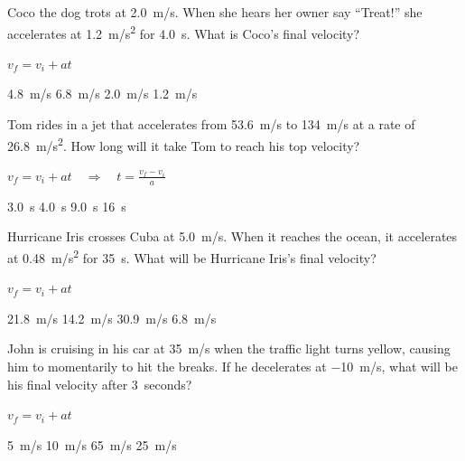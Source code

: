\documentclass[]{exam}
\theoremstyle{definition}
\begin{document}
\begin{questions}

\question
Coco the dog trots at \SI{2.0}{m/s}. When she hears her owner say ``Treat!'' she accelerates at \SI{1.2}{m/s^2} for \SI{4.0}{s}. What is Coco's final velocity?

\ifprintanswers
\bgroup
\color{red}
$v_f = v_i + at$
\egroup
\fi

\begin{choices}
    \choice \SI{4.8}{m/s}
    \correctchoice \SI{6.8}{m/s}
    \choice \SI{2.0}{m/s}
    \choice \SI{1.2}{m/s}
\end{choices}

\question 
Tom rides in a jet that accelerates from \SI{53.6}{m/s} to \SI{134}{m/s} at a rate of \SI{26.8}{m/s^2}. How long will it take Tom to reach his top velocity?

\ifprintanswers
\bgroup
\color{red}
$\displaystyle v_f = v_i + at \quad \Rightarrow \quad t = \frac{v_f - v_i}{a}$
\egroup
\fi

\begin{randomizechoices}
    \correctchoice \SI{3.0}{s}
    \choice \SI{4.0}{s}
    \choice \SI{9.0}{s}
    \choice \SI{16}{s}
\end{randomizechoices}


\question
Hurricane Iris crosses Cuba at \SI{5.0}{m/s}. When it reaches the ocean, it accelerates at \SI{0.48}{m/s^2} for \SI{35}{s}. What will be Hurricane Iris's final velocity?

\ifprintanswers
\bgroup
\color{red}
$v_f = v_i + at$
\egroup
\fi

\begin{randomizechoices}
    \correctchoice \SI{21.8}{m/s}
    \choice \SI{14.2}{m/s}
    \choice \SI{30.9}{m/s}
    \choice \SI{6.8}{m/s}
\end{randomizechoices}



\question
John is cruising in his car at \SI{35}{m/s} when the traffic light turns yellow, causing him to momentarily to hit the breaks. If he decelerates at \SI{-10}{m/s}, what will be his final velocity after \SI{3}{seconds}?

\ifprintanswers
\bgroup
\color{red}
$v_f = v_i + at$
\egroup
\fi

\begin{randomizechoices}
    \correctchoice \SI{5}{m/s}
    \choice \SI{10}{m/s}
    \choice \SI{65}{m/s}
    \choice \SI{25}{m/s}
\end{randomizechoices}


\end{questions}
\end{document}
